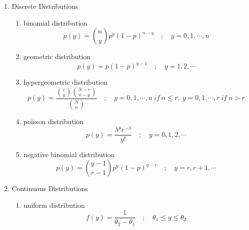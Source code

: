 \documentclass[fleqn]{article}
\begin{document}
\begin{enumerate}

	\item Discrete Distributions
	
	\begin{enumerate}
	
		\item binomial distribution
		\begin{displaymath}
			p(y) = \binom{n}{y} p^{y} (1-p)^{n-y} \quad ; 
			\quad y=0,1,\cdots, n
		\end{displaymath}
		
		
		\item geometric distribution
		\begin{displaymath}
			p(y) = p(1-p)^{y-1} \quad ; 
			\quad y=1, 2, \cdots
		\end{displaymath}
		
		
		\item hypergeometric distribution
		\begin{displaymath}
			p(y) = \frac{ \binom{r}{y} \binom{N-r}{n-y} }
			{\binom{N}{n}} \quad ; \quad
			y = 0, 1, \cdots, n \ if \ n \le r, 
			\ y = 0, 1, \cdots, r \ if \ n > r
		\end{displaymath}
		
				
		\item poisson distribution
		\begin{displaymath}
			p(y) = \frac{\lambda^{y} e^{-\lambda}}{y!} \quad ;
			\quad y = 0, 1, 2, \cdots
		\end{displaymath}
		
		
		\item negative binomial distribution
		\begin{displaymath}
			p(y) = \binom{y-1}{r-1} p^{y} (1-p)^{y-r} \quad ;
			\quad y = r, r+1, \cdots
		\end{displaymath}	

	\end{enumerate}


	\item Continuous Distributions
	
	\begin{enumerate}		
		
		\item uniform distribution
		\begin{displaymath}
			f(y) = \frac{1}{\theta_{2} - \theta_{1}} \quad ;
			\quad \theta_{1} \le y \le \theta_{2}
		\end{displaymath}	
		

\end{enumerate}
\end{enumerate}
\end{document}

